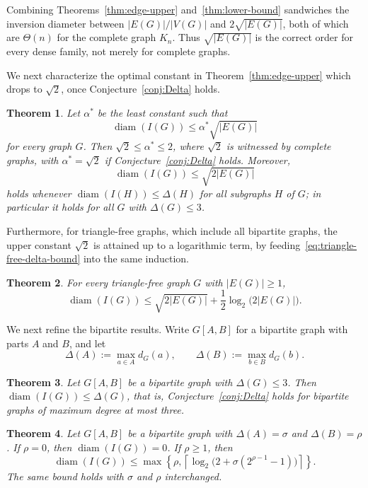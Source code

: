 \documentclass[11pt]{article}
\newtheorem{theorem}{Theorem}[section]
\theoremstyle{remark}
\DeclareMathOperator{\diam}{diam}
\begin{document}
Combining Theorems~\ref{thm:edge-upper} and~\ref{thm:lower-bound} sandwiches the inversion diameter between $|E(G)|/|V(G)|$ and $2\sqrt{|E(G)|}$, both of which are $\Theta(n)$ for the complete graph $K_n$.
Thus $\sqrt{|E(G)|}$ is the correct order for every dense family, not merely for complete graphs.

We next characterize the optimal constant in Theorem~\ref{thm:edge-upper} which   drops to $\sqrt2$, once Conjecture~\ref{conj:Delta} holds.

\begin{theorem}\label{thm:optimal-constant}
Let $\alpha^*$ be the least constant such that
\[
  \diam(I(G))\le \alpha^*\sqrt{|E(G)|}
\]
for every graph $G$.
Then $\sqrt2\le \alpha^*\le2$, where $\sqrt2$ is witnessed by complete graphs,  with $\alpha^*=\sqrt2$ if Conjecture~\ref{conj:Delta} holds.
Moreover,
\[
  \diam(I(G))\le \sqrt{2|E(G)|}
\]
holds whenever $\diam(I(H))\le \Delta(H)$ for all subgraphs $H$ of $G$; in particular it holds for all $G$ with $\Delta(G)\le3$.
\end{theorem}

Furthermore, for triangle-free graphs, which include all bipartite graphs, the upper constant $\sqrt2$ is attained  up to a logarithmic term, by feeding~\eqref{eq:triangle-free-delta-bound} into the same induction.

\begin{theorem}\label{thm:triangle-free-edge}
For every triangle-free graph $G$ with $|E(G)|\ge1$,
\[
  \diam(I(G))\le \sqrt{2|E(G)|}+\frac12\log_2\bigl(2|E(G)|\bigr).
\]
\end{theorem}

We next refine the bipartite results.
Write $G[A,B]$ for a bipartite graph with parts $A$ and $B$, and let
\[
  \Delta(A):=\max_{a\in A}d_G(a),\qquad
  \Delta(B):=\max_{b\in B}d_G(b).
\]

\begin{theorem}\label{thm:bipartite-delta-three}
Let $G[A,B]$ be a bipartite graph with $\Delta(G)\le3$.
Then $\diam(I(G))\le \Delta(G)$, that is, Conjecture~\ref{conj:Delta} holds for bipartite graphs of maximum degree at most three.
\end{theorem}

\begin{theorem}\label{thm:asymmetric-bipartite}
Let $G[A,B]$ be a bipartite graph with $\Delta(A)=\sigma$ and $\Delta(B)=\rho$.
If $\rho=0$, then $\diam(I(G))=0$.
If $\rho\ge1$, then
\[
  \diam(I(G))\le
  \max\left\{\rho,
  \left\lceil\log_2\bigl(2+\sigma(2^{\rho-1}-1)\bigr)\right\rceil\right\}.
\]
The same bound holds with $\sigma$ and $\rho$ interchanged.
\end{theorem}
\end{document}
